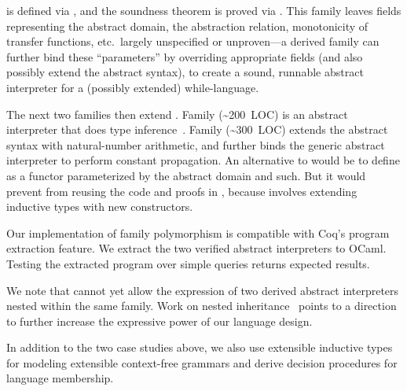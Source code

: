 \noindent
{} is defined via , and the soundness theorem
is proved via .
This family leaves fields representing the abstract domain, the
abstraction relation, monotonicity of transfer functions, etc.\ 
largely unspecified or unproven---a derived family can further bind
these ``parameters'' by overriding appropriate fields (and also possibly
extend the abstract syntax), to create a sound, runnable abstract
interpreter for a (possibly extended) while-language.

The next two families then extend .
Family  (\textasciitilde200~LOC) is an abstract
interpreter that does type inference~\cite{cousot1997types}.
Family  (\textasciitilde300~LOC) extends the abstract syntax
with natural-number arithmetic,
and further binds the generic abstract interpreter to perform constant propagation.
%
An alternative to \Lang would be to define  as a functor parameterized
by the abstract domain and such. But it would prevent  from reusing
the code and proofs in \lsti{ImpGAI}, because \lsti{ImpCP} involves extending
inductive types with new constructors.

Our implementation of family polymorphism is compatible with Coq's
program extraction feature.
We extract the two verified abstract interpreters to OCaml.
Testing the extracted program over simple queries returns expected results.

We note that \Lang cannot yet allow the expression of two derived abstract
interpreters nested within the same family.
Work on nested inheritance~\cite{ncm2004,zm2017} points to a direction
to further increase the expressive power of our language design.


In addition to the two case studies above, we also use extensible
inductive types for modeling extensible context-free grammars and derive
decision procedures for language membership.

